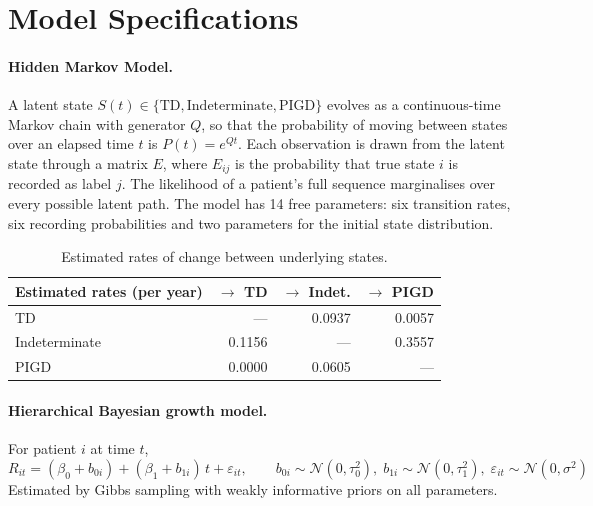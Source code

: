 \documentclass[11pt,a4paper]{article}
\begin{document}
\section{Model Specifications}

\paragraph{Hidden Markov Model.} A latent state $S(t) \in
\{\text{TD},\text{Indeterminate},\text{PIGD}\}$ evolves as a continuous-time
Markov chain with generator $Q$, so that the probability of moving between
states over an elapsed time $t$ is $P(t) = e^{Qt}$. Each observation is drawn
from the latent state through a matrix $E$, where $E_{ij}$ is the probability
that true state $i$ is recorded as label $j$. The likelihood of a patient's full
sequence marginalises over every possible latent path. The model has 14 free
parameters: six transition rates, six recording probabilities and two
parameters for the initial state distribution.

\begin{table}[H]
\centering
\begin{tabular}{@{}lrrr@{}}
\toprule
\textbf{Estimated rates (per year)} & \textbf{$\rightarrow$ TD} & \textbf{$\rightarrow$ Indet.} & \textbf{$\rightarrow$ PIGD} \\
\midrule
TD            & --- & 0.0937 & 0.0057 \\
Indeterminate & 0.1156 & --- & 0.3557 \\
PIGD          & 0.0000 & 0.0605 & --- \\
\bottomrule
\end{tabular}
\caption{Estimated rates of change between underlying states.}
\end{table}

\paragraph{Hierarchical Bayesian growth model.} For patient $i$ at time $t$,
\[
  R_{it} = (\beta_0 + b_{0i}) + (\beta_1 + b_{1i})\,t + \varepsilon_{it},
  \qquad
  b_{0i} \sim \mathcal{N}(0,\tau_0^2),\;
  b_{1i} \sim \mathcal{N}(0,\tau_1^2),\;
  \varepsilon_{it} \sim \mathcal{N}(0,\sigma^2)
\]
Estimated by Gibbs sampling with weakly informative priors on all parameters.
\end{document}
